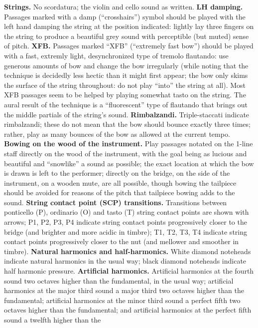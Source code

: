 \textbf{Strings.} No scordatura; the violin and cello sound as written.
\textbf{LH damping.} Passages marked with a damp (``crosshairs'') symbol should
be played with the left hand damping the string at the position indicated:
lightly lay three fingers on the string to produce a beautiful grey sound with
perceptible (but muted) sense of pitch. \textbf{XFB.} Passages marked ``XFB''
(``extremely fast bow'') should be played with a fast, extremly light,
desynchronized type of tremolo flautando: use generous amounts of bow and
change the bow irregularly (while noting that the technique is decidedly less
hectic than it might first appear; the bow only skims the surface of the string
throughout: do not play ``into'' the string at all). Most XFB passages seem to
be helped by playing somewhat tasto on the string. The aural result of the
technique is a ``fluorescent'' type of flautando that brings out the middle
partials of the string's sound. \textbf{Rimbalzandi.} Triple-staccati indicate
rimbalzandi; these do not mean that the bow should bounce exactly three times;
rather, play as many bounces of the bow as allowed at the current tempo.
\textbf{Bowing on the wood of the instrument.} Play passages notated on the
1-line staff directly on the wood of the instrument, with the goal being as
lucious and beautiful and ``snowlike'' a sound as possible; the exact location
at which the bow is drawn is left to the performer; directly on the bridge, on
the side of the instrument, on a wooden mute, are all possible, though bowing
the tailpiece should be avoided for reasons of the pitch that tailpiece bowing
adds to the sound. \textbf{String contact point (SCP) transitions.} Transitions
between ponticello (P), ordinario (O) and tasto (T) string contact points are
shown with arrows; P1, P2, P3, P4 indicate string contact points progressively
closer to the bridge (and brighter and more acidic in timbre); T1, T2, T3, T4
indicate string contact points progressively closer to the nut (and mellower
and smoother in timbre). \textbf{Natural harmonics and half-harmonics.} White
diamond noteheads indicate natural harmonics in the usual way; black diamond
noteheads indicate half harmonic pressure. \textbf{Artificial harmonics.}
Artificial harmonics at the fourth sound two octaves higher than the
fundamental, in the usual way; artificial harmonics at the major third sound a
major third two octaves higher than the fundamental; artificial harmonics at
the minor third sound a perfect fifth two octaves higher than the fundamental;
and artificial harmonics at the perfect fifth sound a twelfth higher than the
